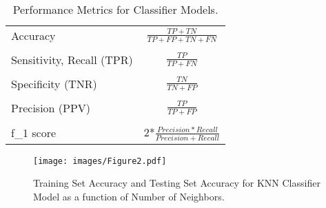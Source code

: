 \documentclass[sigconf]{acmart}
\begin{document}

\begin{table}
  \caption{Performance Metrics for Classifier Models.}
  \label{tab:freq}
  \begin{tabular}{lc}
    \toprule
    Accuracy & \(\frac{TP+TN}{TP+FP+TN+FN}\) \\
    & \\
    Sensitivity, Recall (TPR) &  \(\frac{TP}{TP+FN}\) \\
    & \\
    Specificity (TNR) &  \(\frac{TN}{TN+FP}\) \\
    & \\
    Precision (PPV) & \(\frac{TP}{TP+FP}\)  \\
    & \\
    f_1 score & 2*\(\frac{Precision*Recall}{Precision+Recall}\)
    & \\
    \bottomrule
  \end{tabular}
\end{table}


\begin{figure}[!ht]
  \centering\texttt{[image: images/Figure2.pdf]}
  \caption{Training Set Accuracy and Testing Set Accuracy for KNN Classifier
  Model as a function of Number of Neighbors.}
  \label{f:Figure2}
\end{figure}

\end{document}
